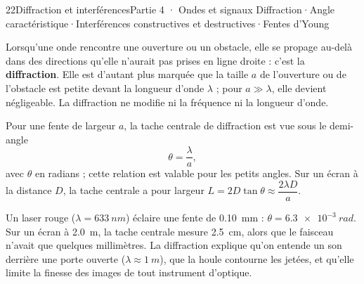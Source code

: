 \begin{ouverture}[interferences]{22}{Diffraction et interférences}{Partie 4 · Ondes et signaux}
{Diffraction\enspace·\enspace Angle caractéristique\enspace·\enspace Interférences constructives et destructives\enspace·\enspace Fentes d'Young}
\end{ouverture}
\essentiel
{}
\begin{definition}[Diffraction]
Lorsqu'une onde rencontre une ouverture ou un obstacle, elle se propage au-delà dans des directions qu'elle n'aurait pas
prises en ligne droite : c'est la \textbf{diffraction}. Elle est d'autant plus marquée que la taille $a$ de l'ouverture
ou de l'obstacle est petite devant la longueur d'onde $\lambda$ ; pour $a\gg\lambda$, elle devient négligeable. La
diffraction ne modifie ni la fréquence ni la longueur d'onde.
\end{definition}
\begin{loi}
Pour une fente de largeur $a$, la tache centrale de diffraction est vue sous le demi-angle
\[\theta=\frac{\lambda}{a},\]
avec $\theta$ en radians ; cette relation est valable pour les petits angles. Sur un écran à la distance $D$, la tache
centrale a pour largeur $L=2D\tan\theta\approx\dfrac{2\lambda D}{a}$.
\end{loi}
\begin{exemple}
Un laser rouge ($\lambda=\qty{633}{nm}$) éclaire une fente de \qty{0,10}{mm} : $\theta=\qty{6,3e-3}{rad}$. Sur un écran à
\qty{2,0}{m}, la tache centrale mesure \qty{2,5}{cm}, alors que le faisceau n'avait que quelques millimètres. La
diffraction explique qu'on entende un son derrière une porte ouverte ($\lambda\approx\qty{1}{m}$), que la houle contourne
les jetées, et qu'elle limite la finesse des images de tout instrument d'optique.
\end{exemple}
